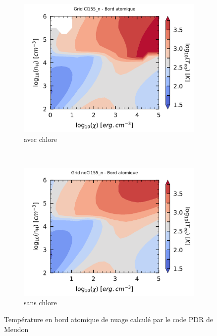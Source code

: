 \begin{figure}[!h]
    \centering
    \begin{subfigure}[t]{0.49\textwidth} %
        \centering \includegraphics[trim = {0 0 0 1cm},clip,width=1\textwidth]{figure/Cl/gridCl155_n/mapTba.pdf}
        \caption{avec chlore}
    \end{subfigure}
    ~ 
    \begin{subfigure}[t]{0.49\textwidth}
        \centering \includegraphics[trim = {0 0 0 1cm},clip,width=1\textwidth]{figure/Cl/gridnoCl155_n/mapTba.pdf}
        \caption{sans chlore}
        \label{fig:Cl:grid:Tba:noCl}
    \end{subfigure}
    \caption{Température en bord atomique de nuage calculé par le code PDR de Meudon}
    \label{fig:Cl:grid:Tba}
\end{figure}

